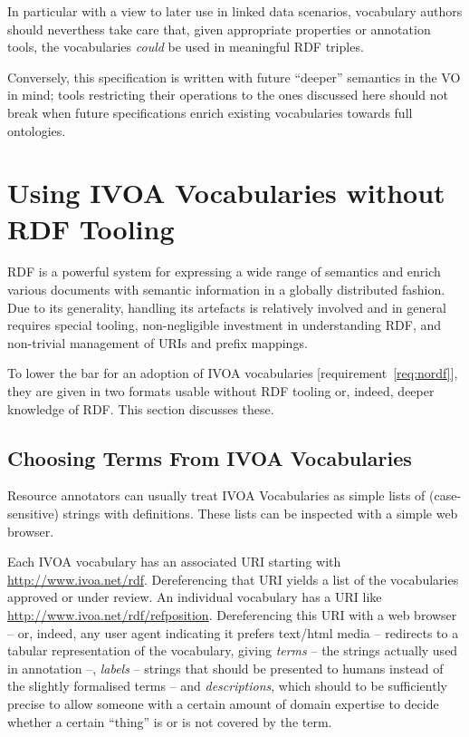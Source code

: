 \documentclass[11pt,a4paper]{ivoa}
\begin{document}
In particular with a view to later use in linked data scenarios,
vocabulary authors should neverthess take care that, given appropriate
properties or annotation tools, the vocabularies \emph{could} be used in
meaningful RDF triples.

Conversely, this specification is written with future ``deeper''
semantics in the VO in mind; tools restricting their operations to the ones
discussed here should not break when future specifications enrich
existing vocabularies towards full ontologies.


\section{Using IVOA Vocabularies without RDF Tooling}
\label{sect:withoutrdf}

RDF is a
powerful system for expressing a wide range of semantics and enrich
various documents with semantic information in a globally distributed
fashion.  Due to its generality, handling its artefacts is relatively
involved and in general requires special tooling, non-negligible
investment in understanding RDF, and non-trivial management of URIs and
prefix mappings.

To lower the bar for an adoption of IVOA vocabularies
[requirement~\ref{req:nordf}], they are given in
two formats usable without RDF tooling or, indeed, deeper knowledge of
RDF.  This section discusses these.

\subsection{Choosing Terms From IVOA Vocabularies}

Resource annotators can usually treat IVOA Vocabularies as simple lists
of (case-sensitive) strings with definitions.  These lists can be
inspected with a simple web browser.

Each IVOA vocabulary has an associated URI starting with
\url{http://www.ivoa.net/rdf}.  Dereferencing that URI yields a list of
the vocabularies approved or under review.  An individual vocabulary has a
URI like \url{http://www.ivoa.net/rdf/refposition}.  Dereferencing this URI
with a web browser -- or, indeed, any user agent indicating it prefers
text/html media -- redirects to a tabular representation of the vocabulary,
giving \emph{terms} – the strings actually used in annotation –,
\emph{labels} – strings that should be presented to humans instead of
the slightly formalised terms – and \emph{descriptions}, which should
to be sufficiently precise to allow someone with a certain amount
of domain expertise to decide whether a certain ``thing'' is or is not
covered by the term.
\end{document}
